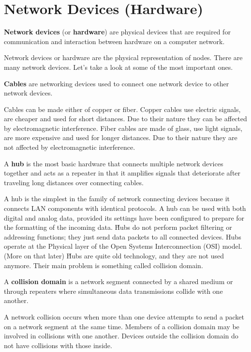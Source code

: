 \section{Network Devices (Hardware)}

\textbf{Network devices} (or \textbf{hardware}) are physical devices that are required for communication and interaction
between hardware on a computer network.
\ed

Network devices or hardware are the physical representation of nodes. There are many network devices. Let's take a
look at some of the most important ones.

\bd[Cables]
\textbf{Cables} are networking devices used to connect one network device to other network devices.
\ed

Cables can be made either of copper or fiber. Copper cables use electric signals, are cheaper and used for short
distances. Due to their nature they can be affected by electromagnetic interference. Fiber cables are made of glass,
use light signals, are more expensive and used for longer distances. Due to their nature they are not affected by
electromagnetic interference.

\bd[Hub]
A \textbf{hub} is the most basic hardware that connects multiple network devices together and acts as a repeater in
that it amplifies signals that deteriorate after traveling long distances over connecting cables.
\ed


A hub is the simplest in the family of network connecting devices because it connects LAN components with identical
protocols. A hub can be used with both digital and analog data, provided its settings have been configured to prepare
for the formatting of the incoming data. \v

Hubs do not perform packet filtering or addressing functions; they just send data packets to all connected devices.
Hubs operate at the Physical layer of the Open Systems Interconnection (OSI) model. (More on that later) \v

Hubs are quite old technology, and they are not used anymore. Their main problem is something called collision domain.

A \textbf{collision domain} is a network segment connected by a shared medium or through repeaters where simultaneous
data transmissions collide with one another.
\ed

A network collision occurs when more than one device attempts to send a packet on a network segment at the same time.
Members of a collision domain may be involved in collisions with one another. Devices outside the collision domain do
not have collisions with those inside.

